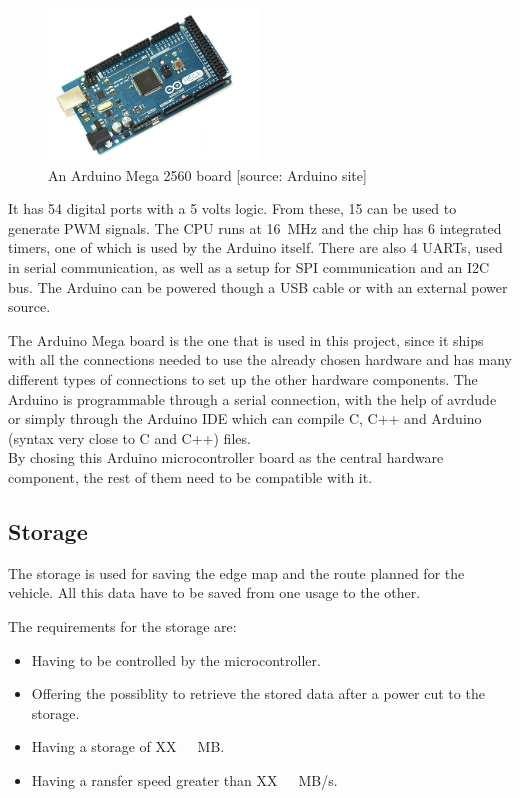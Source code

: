 \begin{figure}[H]
	\centering
	\includegraphics[width=0.5\textwidth]{figures/ArduinoMega.png}
		\caption{An Arduino Mega 2560 board [source: Arduino site]} 
	\label{ArduinoMega}
\end{figure}
%
It has \si{54} digital ports with a 5 volts logic. From these, \si{15} can be used to generate PWM signals. The CPU runs at \si{16 MHz} and the chip has \si{6} integrated timers, one of which is used by the Arduino itself. There are also 4 UARTs, used in serial communication, as well as a setup for SPI communication and an I2C bus. The Arduino can be powered though a USB cable or with an external power source.

The Arduino Mega board is the one that is used in this project, since it ships with all the connections needed to use the already chosen hardware and has many different types of connections to set up the other hardware components. The Arduino is programmable through a serial connection, with the help of avrdude\cite{Avrdude} or simply through the Arduino IDE\cite{ArduinoIDE} which can compile C, C++ and Arduino (syntax very close to C and C++) files.\\
%
By chosing this Arduino microcontroller board as the central hardware component, the rest of them need to be compatible with it.


\subsection{Storage}
The storage is used for saving the edge map and the route planned for the vehicle. All this data have to be saved from one usage to the other.

The requirements for the storage are:
\begin{itemize}
\item Having to be controlled by the microcontroller.
\item Offering the possiblity to retrieve the stored data after a power cut to the storage.
\item Having a storage of \si{XX\ MB}. 
\item Having a ransfer speed greater than \si{XX\ MB/s}. 
\end{itemize}

